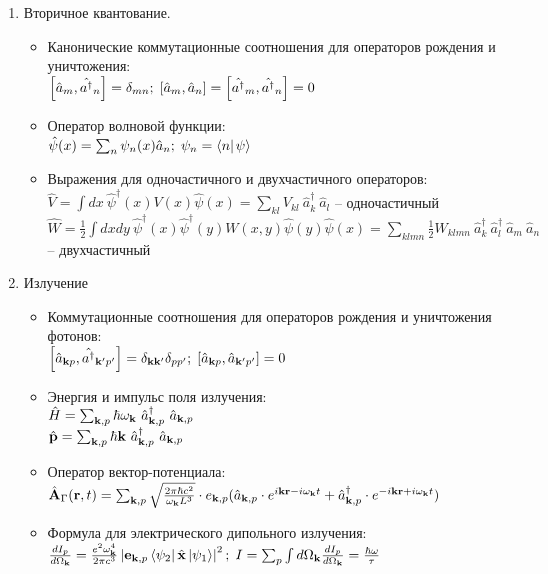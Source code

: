 \begin{enumerate}[label=\textbf{\underline{\arabic*.}}]
\begin{itemize}
        \end{itemize}
\item Вторичное квантование.  \begin{itemize}
            \item Канонические коммутационные соотношения для операторов рождения и уничтожения: \\
            $ \left[ \hat{a}_{m}, \hat{a^\dagger}_{n} \right] = \delta_{mn};\; \left[ \hat{a}_{m}, \hat{a}_{n} \right] = \left[ \hat{a^\dagger}_{m}, \hat{a^\dagger}_{n} \right] = 0 $
            \item Оператор волновой функции: \\
            $ \hat{\psi}(x) = \sum_n \psi_n(x)\hat{a}_n;\; \psi_n = \braket{n}{\psi} $
            \item Выражения для одночастичного и двухчастичного операторов: \\
            $ \hat{V} = \int dx\ \hat{\psi}^\dagger(x)V(x)\hat{\psi}(x) = \sum_{kl} V_{kl}\ \hat{a}^\dagger_k\ \hat{a}_l $ -- одночастичный \\
            $ \hat{W} = \frac12 \int dxdy\ \hat{\psi}^\dagger(x)\hat{\psi}^\dagger(y)W(x,y)\hat{\psi}(y)\hat{\psi}(x) = \sum_{klmn} \frac12 W_{klmn}\ \hat{a}^\dagger_k\ \hat{a}^\dagger_l\ \hat{a}_m\ \hat{a}_n $ -- двухчастичный

        \end{itemize}
\item Излучение  \begin{itemize}
            \item Коммутационные соотношения для операторов рождения и уничтожения фотонов: \\
            $ \left[ \hat{a}_{\mathbf{k}p}, \hat{a^\dagger}_{\mathbf{k}'p'} \right] = \delta_{\mathbf{k}\mathbf{k}'}\delta_{pp'};\; \left[ \hat{a}_{\mathbf{k}p}, \hat{a}_{\mathbf{k}'p'} \right] = 0 $
            \item Энергия и импульс поля излучения: \\
            $ \hat{H} = \sum_{\v{k},p}\hbar\omega_\v{k}\ \hat{a}^\dagger_{\v{k},p}\ \hat{a}_{\v{k},p} $\\
            $ \hat{\v{p}} = \sum_{\v{k},p}\hbar\v{k}\ \hat{a}^\dagger_{\v{k},p}\ \hat{a}_{\v{k},p} $\\
            \item Оператор вектор-потенциала: \\
            $ \hat{\mathbf{A}}_\Gamma(\mathbf{r},t) = \sum_{\mathbf{k},p}\sqrt{\frac{2\pi\hbar c^2}{\omega_{\mathbf{k}}L^3}}\cdot e_{\mathbf{k},p}(\hat{a}_{\mathbf{k},p}\cdot e^{i\mathbf{k}\mathbf{r}-i\omega_{\mathbf{k}}t}+\hat{a}^\dagger_{\mathbf{k},p}\cdot e^{-i\mathbf{k}\mathbf{r}+i\omega_{\mathbf{k}}t}) $
            \item Формула для электрического дипольного излучения: \\
            $ \d{I_p}{\Omega_\v{k}} = \frac{e^2 \omega_\v{k}^4}{2\pi c^3} \abs{ \v{e}_{\v{k},p}\matrixel{\psi_2}{\hat{\v{x}}}{\psi_1}}^2;\; I = \sum_p \int d\Omega_\v{k}\d{I_p}{\Omega_\v{k}} = \frac{\hbar\omega}{\tau} $


\end{itemize}
\end{enumerate}
